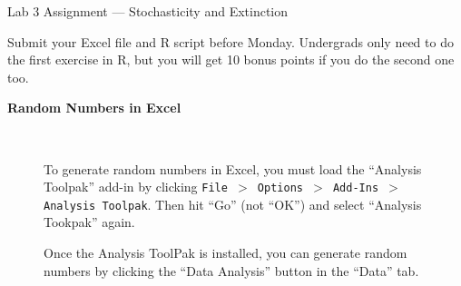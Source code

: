\documentclass[12pt]{article}\usepackage[]{graphicx}\usepackage[]{color}
\begin{document}
{
  \Large
  \centering
  Lab 3 Assignment --- Stochasticity and Extinction \par
  \normalsize
  Submit your Excel file and R script before Monday.
  Undergrads only need to do the first exercise in R, but you will get
  10 bonus points if you do the second one too. \\
}

\vspace{12pt}

{\bf Random Numbers in Excel \\}

\begin{figure}[h]
  \centering
   \\
  \caption{To generate random numbers in Excel, you must load the
    ``Analysis Toolpak'' add-in by clicking
    {\tt File $>$ Options $>$ Add-Ins $>$ Analysis Toolpak}. Then hit
    ``Go'' (not ``OK'') and select ``Analysis Tookpak'' again.}
  \label{fig:rng}
\end{figure}

\clearpage

\begin{figure}[h]
  \centering
  \caption{\footnotesize Once the Analysis ToolPak is installed, you can generate
    random numbers by clicking the ``Data Analysis'' button in the
    ``Data'' tab.
  }
  \label{fig:rng-2}
\end{figure}
\end{document}
